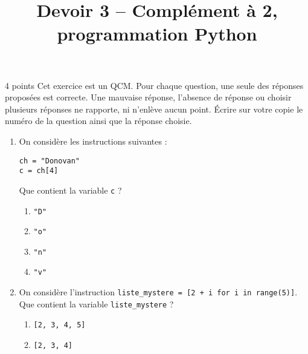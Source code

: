 \documentclass[a4paper,dvipsnames]{article}
\title{Devoir 3 -- Complément à 2, programmation Python}
\author{}
\date{}
\begin{document}
\renewcommand{\contentsname}{}

\pagestyle{fancy}

\begin{tcolorbox}[colframe=blue!75, colback=blue!45, valign=center, height=1.5cm, top=5mm]
  \maketitle
\end{tcolorbox}


\vspace{1cm}

\thispagestyle{fancy}

\begin{exercice}{4 points}{}
  Cet exercice est un QCM. Pour chaque question, une seule des réponses proposées est correcte. Une mauvaise réponse, l'absence de réponse ou choisir plusieurs réponses ne rapporte, ni n'enlève aucun point.
  Écrire sur votre copie le numéro de la question ainsi que la réponse choisie.
  \begin{enumerate}
    \item On considère les instructions suivantes :
      \begin{verbatim}
ch = "Donovan"
c = ch[4]
      \end{verbatim}
      Que contient la variable \texttt{c} ?
      \vspace*{-2mm}
      \begin{multicols}{4}
        \begin{enumerate}
	  \item \texttt{"D"}
	  \item \texttt{"o"}
	  \item \texttt{"n"}
	  \item \texttt{"v"}
        \end{enumerate}
      \end{multicols}
    \item On considère l'instruction \texttt{liste_mystere = [2 + i for i in range(5)]}. Que contient la variable \texttt{liste_mystere} ?
      \vspace*{-2mm}
      \begin{multicols}{2}
        \begin{enumerate}
	  \item \texttt{[2, 3, 4, 5]}
	  \item \texttt{[2, 3, 4]}

\end{enumerate}
\end{multicols}
\end{enumerate}
\end{exercice}
\end{document}
